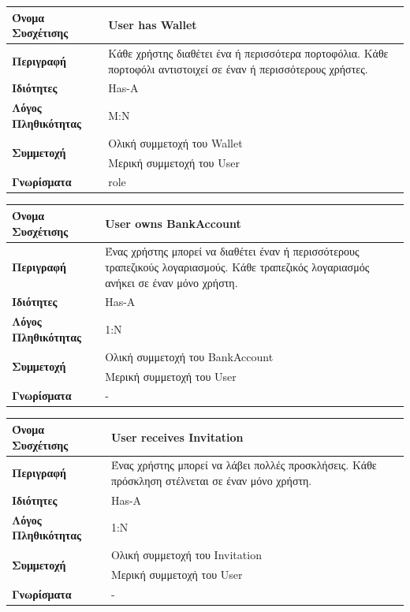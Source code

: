\noindent
\begin{tabular}{|p{4cm}|p{10cm}|}
\hline
\textbf{Όνομα Συσχέτισης} & User has Wallet \\ \hline
\textbf{Περιγραφή} & Κάθε χρήστης διαθέτει ένα ή περισσότερα πορτοφόλια. Κάθε πορτοφόλι αντιστοιχεί σε έναν
ή περισσότερους χρήστες. \\ \hline
\textbf{Ιδιότητες} & Has-A \\ \hline
\textbf{Λόγος Πληθικότητας} & M:N \\ \hline
\multirow{2}{4cm}{\textbf{Συμμετοχή}} 
& Ολική συμμετοχή του Wallet \\
\cline{2-2}
& Μερική συμμετοχή του User \\
\hline
\textbf{Γνωρίσματα} & role \\ \hline
\end{tabular}

\vspace{1cm}

\noindent
\begin{tabular}{|p{4cm}|p{10cm}|}
\hline
\textbf{Όνομα Συσχέτισης} & User owns BankAccount \\ \hline
\textbf{Περιγραφή} & Ένας χρήστης μπορεί να διαθέτει έναν ή περισσότερους τραπεζικούς λογαριασμούς. 
Κάθε τραπεζικός λογαριασμός ανήκει σε έναν μόνο χρήστη. \\ \hline
\textbf{Ιδιότητες} & Has-A \\ \hline
\textbf{Λόγος Πληθικότητας} & 1:N \\ \hline
\multirow{2}{4cm}{\textbf{Συμμετοχή}}
& Ολική συμμετοχή του BankAccount \\ \cline{2-2}
& Μερική συμμετοχή του User \\ \hline
\textbf{Γνωρίσματα} & - \\ \hline
\end{tabular}

\vspace{1cm}

\noindent
\begin{tabular}{|p{4cm}|p{10cm}|}
\hline
\textbf{Όνομα Συσχέτισης} & User receives Invitation \\ \hline
\textbf{Περιγραφή} & Ένας χρήστης μπορεί να λάβει πολλές προσκλήσεις. Κάθε πρόσκληση στέλνεται σε 
έναν μόνο χρήστη. \\ \hline
\textbf{Ιδιότητες} & Has-A \\ \hline
\textbf{Λόγος Πληθικότητας} & 1:N \\ \hline
\multirow{2}{4cm}{\textbf{Συμμετοχή}}
& Ολική συμμετοχή του Invitation \\ \cline{2-2}
& Μερική συμμετοχή του User \\ \hline
\textbf{Γνωρίσματα} & - \\ \hline
\end{tabular}

